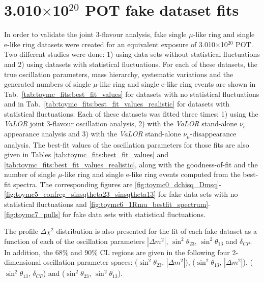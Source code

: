 \clearpage

\section{3.010$\times$10$^{20}$ POT fake dataset fits}
\label{app:fake_dataset_fits}

In order to validate the joint 3-flavour analysis, fake single $\mu$-like ring and 
single e-like ring datasets were created for an equivalent exposure of 3.010$\times$10$^{20}$ POT. 
Two different studies were done: 1) using data sets without statistical fluctuations and 2) using datasets with statistical fluctuations. 
For each of these datasets, the true oscillation parameters, 
mass hierarchy, systematic variations and the generated numbers of single $\mu$-like ring and 
single e-like ring events are shown in Tab.\ \ref{tab:toymc_fits:best_fit_values} for datasets with no statistical fluctuations and in 
Tab.\ \ref{tab:toymc_fits:best_fit_values_realistic} for datasets with statistical fluctuations. 
Each of these datasets was fitted three times: 1) using the {\em VaLOR} joint 3-flavour oscillation analysis,
2) with the {\em VaLOR} stand-alone $\nu_{e}$ appearance analysis and 3) with the {\em VaLOR} stand-alone $\nu_{\mu}$-disappearance analysis.
The best-fit values of the oscillation parameters for those fits 
are also given in Tables \ref{tab:toymc_fits:best_fit_values} and \ref{tab:toymc_fits:best_fit_values_realistic},  
along with the goodness-of-fit and the number of single $\mu$-like ring and single e-like ring events
computed from the best-fit spectra. The corresponding figures are \ref{fig:toymc0_dchisq_Dmsq}-\ref{fig:toymc5_confreg_sinsqtheta23_sinsqtheta13} for fake data sets with no 
statistical fluctuations and \ref{fig:toymc6_1Rmu_bestfit_spectrum}-\ref{fig:toymc7_pulls} for fake data sets with statistical fluctuations. 

The profile $\Delta\chi^2$ distribution is also presented for the fit of each fake dataset as a function 
of each of the oscillation parameters $|\Delta m^{2}|$, $\sin^{2}\theta_{23}$, $\sin^{2}\theta_{13}$ and $\delta_{CP}$. 
In addition, the 68\% and 90\% CL regions are given in the following four 2-dimensional oscillation parameter spaces: 
($\sin^{2}\theta_{23}$, $|\Delta m^{2}|$), 
($\sin^{2}\theta_{13}$, $|\Delta m^{2}|$),
($\sin^{2}\theta_{13}$, $\delta_{CP}$) and
($\sin^{2}\theta_{23}$, $\sin^{2}\theta_{13}$).

